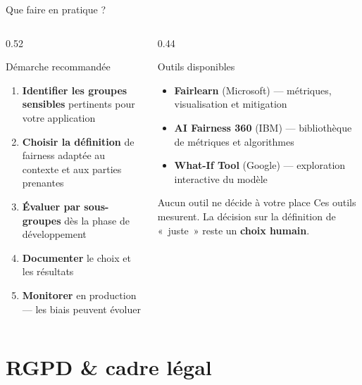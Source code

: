 \documentclass[aspectratio=169, 10pt]{beamer}
\begin{document}
\begin{frame}{Que faire en pratique ?}
  \begin{columns}[T]
    \begin{column}{0.52\textwidth}
      \begin{exampleblock}{Démarche recommandée}
        \begin{enumerate}
          \item \textbf{Identifier les groupes sensibles}
                pertinents pour votre application
          \item \textbf{Choisir la définition} de fairness
                adaptée au contexte et aux parties prenantes
          \item \textbf{Évaluer par sous-groupes}
                dès la phase de développement
          \item \textbf{Documenter} le choix et les résultats
          \item \textbf{Monitorer} en production
                — les biais peuvent évoluer
        \end{enumerate}
      \end{exampleblock}
    \end{column}
    \begin{column}{0.44\textwidth}
      \begin{block}{Outils disponibles}
        \begin{itemize}
          \item \textbf{Fairlearn} (Microsoft) ---
                métriques, visualisation et mitigation
          \item \textbf{AI Fairness 360} (IBM) ---
                bibliothèque de métriques et algorithmes
          \item \textbf{What-If Tool} (Google) ---
                exploration interactive du modèle
        \end{itemize}
      \end{block}
      \smallskip
      \begin{alertblock}{Aucun outil ne décide à votre place}
        Ces outils mesurent.
        La décision sur la définition de «~juste~»
        reste un \textbf{choix humain}.
      \end{alertblock}
    \end{column}
  \end{columns}
\end{frame}

\section{RGPD \& cadre légal}
\end{document}
